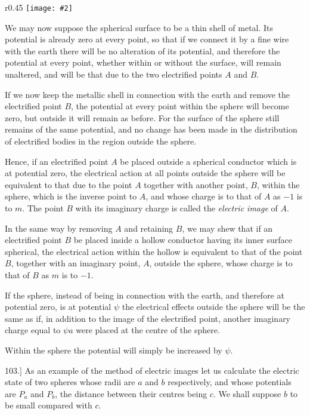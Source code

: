 \documentclass[12pt,oneside]{book}[2021/10/04]
\newcommand{\Runhead}[1]{\fancyhead[C]{\iffloatpage{}{\small#1}}}
\newcommand{\article}[1]{\phantomsection \label{art:#1}{#1.]}}
\newcommand{\wrapfig}[3]{
\begin{wrapfigure}{r}{#1\textwidth}
\centering
\texttt{[image: \#2]}
\caption*{\small #3}
\end{wrapfigure}}
\newcommand{\¬}{\hphantom{0}}
\begin{document}
\wrapfig{0.45}{101.png}{Fig. 23.}
We may now suppose the spherical
surface to be a thin shell of metal.
Its potential is already zero at every
point, so that if we connect it by a
fine wire with the earth there will
be no alteration of its potential,
and therefore the potential at every
point, whether within or without
the surface, will remain unaltered, and will be that due to the two
electrified points \(A\) and \(B\).

If we now keep the metallic shell in connection with the earth
and remove the electrified point \(B\), the potential at every point
within the sphere will become zero, but outside it will remain as
before. For the surface of the sphere still remains of the same
potential, and no change has been made in the distribution of
electrified bodies in the region outside the sphere.

Hence, if an electrified point \(A\) be placed outside a spherical conductor
which is at potential zero, the electrical action at all points
outside the sphere will be equivalent to that due to the point \(A\)
together with another point, \(B\), within the sphere, which is the
inverse point to \(A\), and whose charge is to that of \(A\) as \(-1\) is to \(m\).
The point \(B\) with its imaginary charge is called the \textit{electric image} of \(A\).
\Runhead{IMAGE OF A POINT.}

In the same way by removing \(A\) and retaining \(B\), we may shew
that if an electrified point \(B\) be placed inside a hollow conductor
having its inner surface spherical, the electrical action within the
hollow is equivalent to that of the point \(B\), together with an
imaginary point, \(A\), outside the sphere, whose charge is to that
of \(B\) as \(m\) is to \(-1\).

If the sphere, instead of being in connection with the earth, and
therefore at potential zero, is at potential \(\psi\) the electrical effects
outside the sphere will be the same as if, in addition to the image
of the electrified point, another imaginary charge equal to \(\psi a\) were
placed at the centre of the sphere.

Within the sphere the potential will simply be increased by \(\psi\).
\Runhead{ELECTRICAL IMAGES.}

\article{103} As an example of the method of electric images let us
calculate the electric state of two spheres whose radii are \(a\) and \(b\)
respectively, and whose potentials are \(P_a\) and \(P_b\), the distance between
their centres being \(c\). We shall suppose \(b\) to be small compared
with \(c\).
\end{document}
